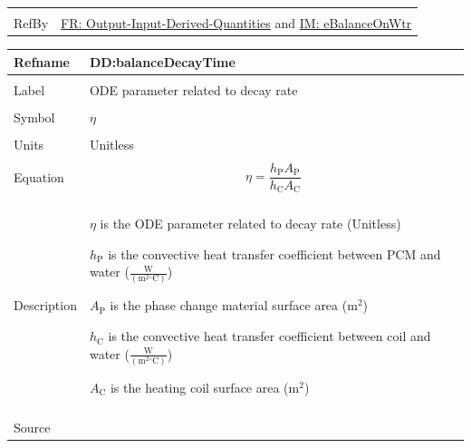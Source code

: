 \documentclass[12pt]{article}
\begin{document}
\begin{minipage}{\textwidth}
\begin{tabular}{>{\raggedright}p{}>{\raggedright\arraybackslash}p{}}
\\ \midrule \\
RefBy & \hyperref[outputInputDerivQuants]{FR: Output-Input-Derived-Quantities} and \hyperref[IM:eBalanceOnWtr]{IM: eBalanceOnWtr}
        
\\ \bottomrule
\end{tabular}
\end{minipage}

\vspace{\baselineskip}
\noindent
\begin{minipage}{\textwidth}
\begin{tabular}{>{\raggedright}p{}>{\raggedright\arraybackslash}p{}}
\toprule \textbf{Refname} & \textbf{DD:balanceDecayTime}
\label{DD:balanceDecayTime}
\\ \midrule \\
Label & ODE parameter related to decay rate
        
\\ \midrule \\
Symbol & $η$
         
\\ \midrule \\
Units & Unitless
        
\\ \midrule \\
Equation & \begin{displaymath}
           η=\frac{{h_{\text{P}}} {A_{\text{P}}}}{{h_{\text{C}}} {A_{\text{C}}}}
           \end{displaymath}
\\ \midrule \\
Description & \begin{symbDescription}
              \item{$η$ is the ODE parameter related to decay rate (Unitless)}
              \item{${h_{\text{P}}}$ is the convective heat transfer coefficient between PCM and water ($\frac{\text{W}}{(\text{m}^{2}{}^{\circ}\text{C})}$)}
              \item{${A_{\text{P}}}$ is the phase change material surface area ($\text{m}^{2}$)}
              \item{${h_{\text{C}}}$ is the convective heat transfer coefficient between coil and water ($\frac{\text{W}}{(\text{m}^{2}{}^{\circ}\text{C})}$)}
              \item{${A_{\text{C}}}$ is the heating coil surface area ($\text{m}^{2}$)}
              \end{symbDescription}
\\ \midrule \\
Source & \cite{koothoor2013}
         

\end{tabular}
\end{minipage}
\end{document}
